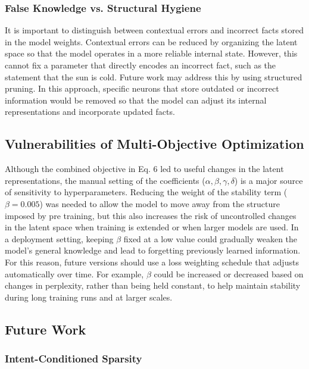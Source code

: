 \documentclass[11pt, letterpaper]{article}
\begin{document}
\subsubsection{False Knowledge vs. Structural Hygiene}
It is important to distinguish between contextual errors and incorrect facts stored in the model weights. Contextual errors can be reduced by organizing the latent space so that the model operates in a more reliable internal state. However, this cannot fix a parameter that directly encodes an incorrect fact, such as the statement that the sun is cold.
Future work may address this by using structured pruning. In this approach, specific neurons that store outdated or incorrect information would be removed so that the model can adjust its internal representations and incorporate updated facts.

\subsection{Vulnerabilities of Multi-Objective Optimization}

Although the combined objective in Eq. 6 led to useful changes in the latent representations, the manual setting of the coefficients ($\alpha, \beta, \gamma, \delta$) is a major source of sensitivity to hyperparameters. Reducing the weight of the stability term ($\beta = 0.005$) was needed to allow the model to move away from the structure imposed by pre training, but this also increases the risk of uncontrolled changes in the latent space when training is extended or when larger models are used.
In a deployment setting, keeping $\beta$ fixed at a low value could gradually weaken the model’s general knowledge and lead to forgetting previously learned information. For this reason, future versions should use a loss weighting schedule that adjusts automatically over time. For example, $\beta$ could be increased or decreased based on changes in perplexity, rather than being held constant, to help maintain stability during long training runs and at larger scales.

\subsection{Future Work}

\subsubsection{Intent-Conditioned Sparsity}
\end{document}
